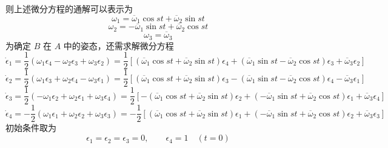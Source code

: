 \begin{example}
\begin{equation}
        \label{eq:角速度欧拉:常数s}
    \end{equation}
    则上述微分方程的通解可以表示为
    \begin{equation}
        \omega_1 = \overline{\omega}_1\cos st + \overline{\omega}_2\sin st
    \end{equation}
    \begin{equation}
        \omega_2 = -\overline{\omega}_1\sin st + \overline{\omega}_2\cos st
    \end{equation}
    \begin{equation}
        \omega_3 = \overline{\omega}_3
    \end{equation}
    为确定 $B$ 在 $A$ 中的姿态，还需求解微分方程
    \begin{equation}
        \dot{\epsilon}_1 = \frac{1}{2}(\omega_1\epsilon_4-\omega_2\epsilon_3+\omega_3\epsilon_2)
        = \frac{1}{2}[(\overline{\omega}_1\cos st+\overline{\omega}_2\sin st)\epsilon_4
        + (\overline{\omega}_1\sin st-\overline{\omega}_2\cos st)\epsilon_3
        + \overline{\omega}_3\epsilon_2]
    \end{equation}
    \begin{equation}
        \dot{\epsilon}_2 = \frac{1}{2}(\omega_1\epsilon_3+\omega_2\epsilon_4-\omega_3\epsilon_1)
        = \frac{1}{2}[(\overline{\omega}_1\cos st+\overline{\omega}_2\sin st)\epsilon_3
        - (\overline{\omega}_1\sin st-\overline{\omega}_2\cos st)\epsilon_4
        - \overline{\omega}_3\epsilon_1]
    \end{equation}
    \begin{equation}
        \dot{\epsilon}_3 = \frac{1}{2}(-\omega_1\epsilon_2+\omega_2\epsilon_1+\omega_3\epsilon_4)
        = \frac{1}{2}[-(\overline{\omega}_1\cos st+\overline{\omega}_2\sin st)\epsilon_2
        + (-\overline{\omega}_1\sin st+\overline{\omega}_2\cos st)\epsilon_1
        + \overline{\omega}_3\epsilon_4]
    \end{equation}
    \begin{equation}
        \dot{\epsilon}_4 = -\frac{1}{2}(\omega_1\epsilon_1+\omega_2\epsilon_2+\omega_3\epsilon_3)
        = -\frac{1}{2}[(\overline{\omega}_1\cos st+\overline{\omega}_2\sin st)\epsilon_1
        + (-\overline{\omega}_1\sin st+\overline{\omega}_2\cos st)\epsilon_2
        + \overline{\omega}_3\epsilon_3]
    \end{equation}
    初始条件取为
    \begin{equation}
        \epsilon_1=\epsilon_2=\epsilon_3=0,\qquad \epsilon_4=1\quad (t=0)
    \end{equation}

\end{example}
